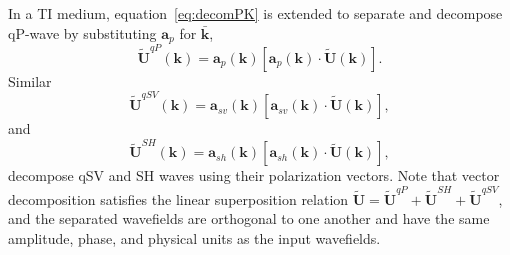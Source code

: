 In a TI medium, equation~\ref{eq:decomPK} is extended to separate and decompose qP-wave by substituting $\mathbf{a}_{p}$ for $\bar{\mathbf{k}}$,
\begin{equation}
\label{eq:decomPKTI}
\tilde{\mathbf{U}}^{qP}(\mathbf{k}) = \mathbf{a}_{p}(\mathbf{k})[\mathbf{a}_{p}(\mathbf{k})\cdot\tilde{\mathbf{U}}(\mathbf{k})].
\end{equation}
Similar 
\begin{equation}
\label{eq:decomSVKTI}
\tilde{\mathbf{U}}^{qSV}(\mathbf{k}) = \mathbf{a}_{sv}(\mathbf{k})[\mathbf{a}_{sv}(\mathbf{k})\cdot\tilde{\mathbf{U}}(\mathbf{k})],
\end{equation}
and
\begin{equation}
\label{eq:decomSHKTI}
\tilde{\mathbf{U}}^{SH}(\mathbf{k}) = \mathbf{a}_{sh}(\mathbf{k})[\mathbf{a}_{sh}(\mathbf{k})\cdot\tilde{\mathbf{U}}(\mathbf{k})],
\end{equation}
decompose qSV and SH waves using their  polarization vectors.
Note that vector decomposition satisfies the linear superposition relation
 $\tilde{\mathbf{U}} = \tilde{\mathbf{U}}^{qP} + \tilde{\mathbf{U}}^{SH} + \tilde{\mathbf{U}}^{qSV}$, 
and the separated wavefields are orthogonal to one another and have the same amplitude, phase, and physical units as the input wavefields.
